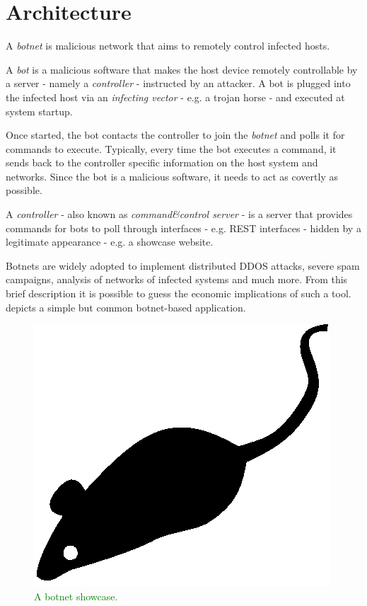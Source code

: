 \section{Architecture}
\label{sec:architecture}

A \textit{botnet} is malicious network that aims to remotely control infected hosts.

A \textit{bot} is a malicious software that makes the host device remotely controllable by a server - namely a \textit{controller} -  instructed by an attacker. A bot is plugged into the infected host via an \textit{infecting vector} - e.g. a trojan horse - and executed at system startup.

Once started, the bot contacts the controller to join the \textit{botnet} and polls it for commands to execute. Typically, every time the bot executes a command, it sends back to the controller specific information on the host system and networks. Since the bot is a malicious software, it needs to act as covertly as possible.

A \textit{controller} - also known as \textit{command\&control server} - is a server that provides commands for bots to poll through interfaces - e.g. REST interfaces - hidden by a legitimate appearance - e.g. a showcase website.

Botnets are widely adopted to implement distributed DDOS attacks, severe spam campaigns, analysis of networks of infected systems and much more. From this brief description it is possible to guess the economic implications of such a tool.  depicts a simple but common botnet-based application.

\begin{figure}[tp]
  \centering
  \includegraphics{./fig/acmlarge-mouse}
  \caption{\textcolor{green}{A botnet showcase.}}
    \label{fig:botnet-showcase}
\end{figure}

